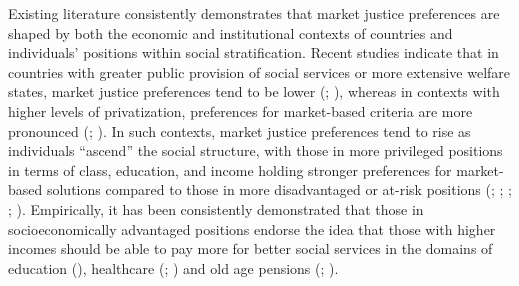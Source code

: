 \documentclass[
  12pt,
]{article}
\begin{document}
Existing literature consistently demonstrates that market justice
preferences are shaped by both the economic and institutional contexts
of countries and individuals' positions within social stratification.
Recent studies indicate that in countries with greater public provision
of social services or more extensive welfare states, market justice
preferences tend to be lower
(;
), whereas
in contexts with higher levels of privatization, preferences for
market-based criteria are more pronounced
(;
). In such contexts, market
justice preferences tend to rise as individuals ``ascend'' the social
structure, with those in more privileged positions in terms of class,
education, and income holding stronger preferences for market-based
solutions compared to those in more disadvantaged or at-risk positions
(;
;
;
;
). Empirically,
it has been consistently demonstrated that those in socioeconomically
advantaged positions endorse the idea that those with higher incomes
should be able to pay more for better social services in the domains of
education (),
healthcare (; ) and old age pensions
(;
).
\end{document}

